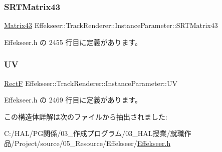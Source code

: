 \subsubsection{\texorpdfstring{S\+R\+T\+Matrix43}{SRTMatrix43}}
{\footnotesize\ttfamily \mbox{\hyperlink{struct_effekseer_1_1_matrix43}{Matrix43}} Effekseer\+::\+Track\+Renderer\+::\+Instance\+Parameter\+::\+S\+R\+T\+Matrix43}



 Effekseer.\+h の 2455 行目に定義があります。

\mbox{\label{struct_effekseer_1_1_track_renderer_1_1_instance_parameter_af468b7ab57e170535ef8952a5a1a1e17}} 
\subsubsection{\texorpdfstring{UV}{UV}}
{\footnotesize\ttfamily \mbox{\hyperlink{struct_effekseer_1_1_rect_f}{RectF}} Effekseer\+::\+Track\+Renderer\+::\+Instance\+Parameter\+::\+UV}



 Effekseer.\+h の 2469 行目に定義があります。



この構造体詳解は次のファイルから抽出されました\+:\begin{DoxyCompactItemize}
\item 
C\+:/\+H\+A\+L/\+P\+G関係/03\+\_\+作成プログラム/03\+\_\+\+H\+A\+L授業/就職作品/\+Project/source/05\+\_\+\+Resource/\+Effekseer/\mbox{\hyperlink{_effekseer_8h}{Effekseer.\+h}}\end{DoxyCompactItemize}

